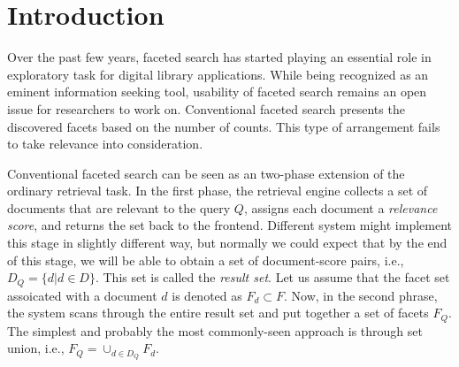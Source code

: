 \section{Introduction}


Over the past few years, faceted search has started playing an essential role
in exploratory task for digital library applications.  While being recognized
as an eminent information seeking tool, usability of faceted search remains an
open issue for researchers to work on.  Conventional faceted search presents
the discovered facets based on the number of counts.  This type of arrangement
fails to take relevance into consideration. 

Conventional faceted search can be seen as an two-phase extension of the
ordinary retrieval task.  In the first phase, the retrieval engine collects a
set of documents that are relevant to the query $Q$, assigns each document a
\emph{relevance score}, and returns the set back to the frontend.  Different
system might implement this stage in slightly different way, but normally we
could expect that by the end of this stage, we will be able to obtain a set of
document-score pairs, i.e.,$D_Q = \{ d | d \in D \}$.  This set is called the
\emph{result set}.  Let us assume that the facet set assoicated with a document
$d$ is denoted as $F_d \subset F$.  Now, in the second phrase, the system scans
through the entire result set and put together a set of facets $F_Q$.  The
simplest and probably the most commonly-seen approach is through set union,
i.e., $F_Q = \cup_{d \in D_Q} F_d$.  

